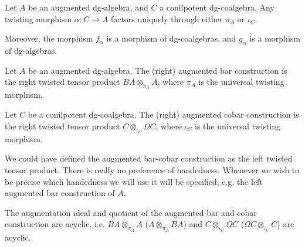 \documentclass[../thesis.tex]{subfiles}
\begin{document}
            \begin{corollary}\label{cor: universal-twisting}
                Let $A$ be an augmented dg-algebra, and $C$ a conilpotent dg-coalgebra. Any twisting morphism $\alpha : C \rightarrow A$ factors uniquely through either $\pi_A$ or $\iota_C$.
                
                \begin{center}
                \end{center}
                Moreover, the morphism $f_\alpha$ is a morphism of dg-coalgebras, and $g_\alpha$ is a morphism of dg-algebras.
            \end{corollary}

            \begin{definition}
                Let $A$ be an augmented dg-algebra. The (right) augmented bar construction is the right twisted tensor product $BA \otimes_{\pi_A} A$, where $\pi_A$ is the universal twisting morphism.

                Let $C$ be a conilpotent dg-coalgebra. The (right) augmented cobar construction is the right twisted tensor product $C \otimes_{\iota_C} \Omega C$, where $\iota_C$ is the universal twisting morphism.
            \end{definition}

            \begin{remark}
                We could have defined the augmented bar-cobar construction as the left twisted tensor product. There is really no preference of handedness. Whenever we wish to be precise which handedness we will use it will be specified, e.g. the left augmented bar construction of $A$.
            \end{remark}

            \begin{proposition}\label{prop: aug-bar-ac}
                The augmentation ideal and quotient of the augmented bar and cobar construction are acyclic, i.e. $BA \overline{\otimes}_{\pi_A} A$ ($A \overline{\otimes}_{\pi_A} BA$) and $C \overline{\otimes}_{\iota_C}\Omega C$ ($\Omega C \overline{\otimes}_{\iota_C} C$) are acyclic.
            \end{proposition}
\end{document}
